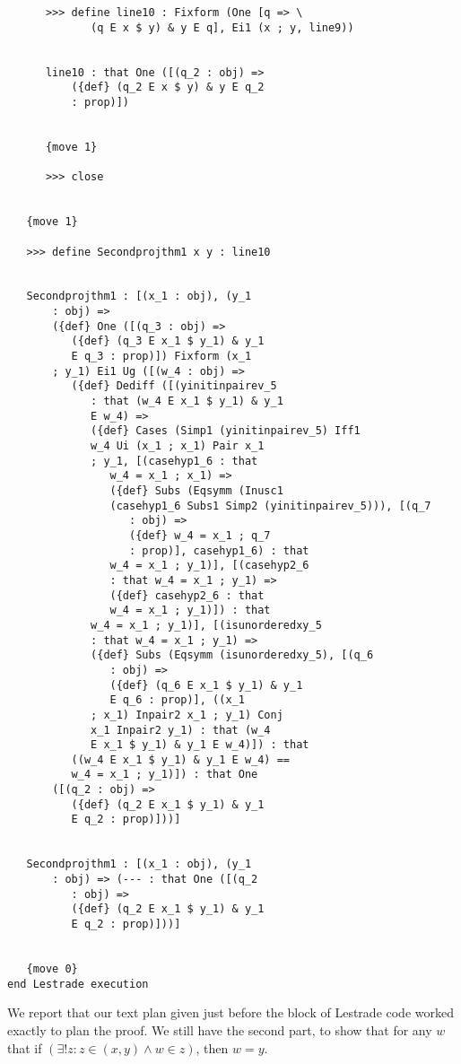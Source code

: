 \documentclass[12pt]{article}
\begin{document}
\begin{verbatim}
      >>> define line10 : Fixform (One [q => \
             (q E x $ y) & y E q], Ei1 (x ; y, line9))


      line10 : that One ([(q_2 : obj) => 
          ({def} (q_2 E x $ y) & y E q_2 
          : prop)])


      {move 1}

      >>> close


   {move 1}

   >>> define Secondprojthm1 x y : line10


   Secondprojthm1 : [(x_1 : obj), (y_1 
       : obj) => 
       ({def} One ([(q_3 : obj) => 
          ({def} (q_3 E x_1 $ y_1) & y_1 
          E q_3 : prop)]) Fixform (x_1 
       ; y_1) Ei1 Ug ([(w_4 : obj) => 
          ({def} Dediff ([(yinitinpairev_5 
             : that (w_4 E x_1 $ y_1) & y_1 
             E w_4) => 
             ({def} Cases (Simp1 (yinitinpairev_5) Iff1 
             w_4 Ui (x_1 ; x_1) Pair x_1 
             ; y_1, [(casehyp1_6 : that 
                w_4 = x_1 ; x_1) => 
                ({def} Subs (Eqsymm (Inusc1 
                (casehyp1_6 Subs1 Simp2 (yinitinpairev_5))), [(q_7 
                   : obj) => 
                   ({def} w_4 = x_1 ; q_7 
                   : prop)], casehyp1_6) : that 
                w_4 = x_1 ; y_1)], [(casehyp2_6 
                : that w_4 = x_1 ; y_1) => 
                ({def} casehyp2_6 : that 
                w_4 = x_1 ; y_1)]) : that 
             w_4 = x_1 ; y_1)], [(isunorderedxy_5 
             : that w_4 = x_1 ; y_1) => 
             ({def} Subs (Eqsymm (isunorderedxy_5), [(q_6 
                : obj) => 
                ({def} (q_6 E x_1 $ y_1) & y_1 
                E q_6 : prop)], ((x_1 
             ; x_1) Inpair2 x_1 ; y_1) Conj 
             x_1 Inpair2 y_1) : that (w_4 
             E x_1 $ y_1) & y_1 E w_4)]) : that 
          ((w_4 E x_1 $ y_1) & y_1 E w_4) == 
          w_4 = x_1 ; y_1)]) : that One 
       ([(q_2 : obj) => 
          ({def} (q_2 E x_1 $ y_1) & y_1 
          E q_2 : prop)]))]


   Secondprojthm1 : [(x_1 : obj), (y_1 
       : obj) => (--- : that One ([(q_2 
          : obj) => 
          ({def} (q_2 E x_1 $ y_1) & y_1 
          E q_2 : prop)]))]


   {move 0}
end Lestrade execution
\end{verbatim}

We report that our text plan given just before the block of Lestrade code worked exactly to plan the proof.  We still have the second part, to show that for any $w$ that if $(\exists! z: z \in (x,y) \wedge w \in z)$, then $w=y$.
\end{document}
